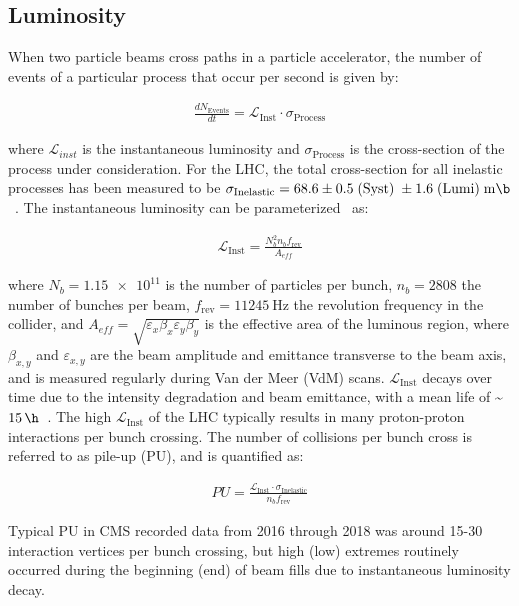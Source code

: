 \subsection{Luminosity}
When two particle beams cross paths in a particle accelerator, the number of events of a particular process that occur per second is given by:
\begin{linenomath*}
\begin{align}
{\frac{dN_{\text {Events}}}{dt}}= \mathcal{L}_{\text{Inst}} \cdot \sigma_{\text{Process}}
\end{align}
\end{linenomath*}
where $\mathcal{L}_{inst}$ is the instantaneous luminosity and $\sigma_{\text{Process}}$ is the cross-section of the process under consideration.
For the \beamenergy LHC, the total cross-section for all inelastic processes has been measured to be $\sigma_{\text{Inelastic}} = 68.6 \pm 0.5 \; (\text{Syst}) \; \pm 1.6 \; (\text{Lumi}) \; \si{\milli \b}$~\cite{inelasticprotonprotoncrosssection}.
The instantaneous luminosity can be parameterized~\cite{Karacheban:2294183} as:
\begin{linenomath*}
\begin{align}
\mathcal{L}_{\text{Inst}}=\frac{N_b^2 n_b f_{\mathrm{rev}}}{A_{eff}}
\end{align}
\end{linenomath*}
where $N_b = \num{1.15e11}$ is the number of particles per bunch, $n_b=2808$ the number of bunches per beam, $f_{\mathrm{rev}} = \SI{11245}{\Hz}$ the revolution frequency in the collider, and $A_{eff} = \sqrt{\varepsilon_x \beta_x \varepsilon_y \beta_y}$ is the effective area of the luminous region, where $\beta_{x,y}$ and $\varepsilon_{x,y}$ are the beam amplitude and emittance transverse to the beam axis, and is measured regularly during Van der Meer (VdM) scans.
$\mathcal{L}_{\text{Inst}}$ decays over time due to the intensity degradation and beam emittance, with a mean life of \sim$\SI{15}{\h}$~\cite{LyndonEvans_2008}.
The high $\mathcal{L}_{\text{Inst}}$ of the LHC typically results in many proton-proton interactions per bunch crossing.
The number of collisions per bunch cross is referred to as pile-up (PU), and is quantified as:
\begin{linenomath*}
\begin{align}
PU = \frac{\mathcal{L}_{\text{Inst}} \cdot \sigma_{\text{Inelastic}}}{n_b f_{\mathrm{rev}}}
\end{align}
\end{linenomath*}
Typical PU in CMS recorded data from 2016 through 2018 was around 15-30 interaction vertices per bunch crossing, but high (low) extremes routinely occurred during the beginning (end) of beam fills due to instantaneous luminosity decay.
